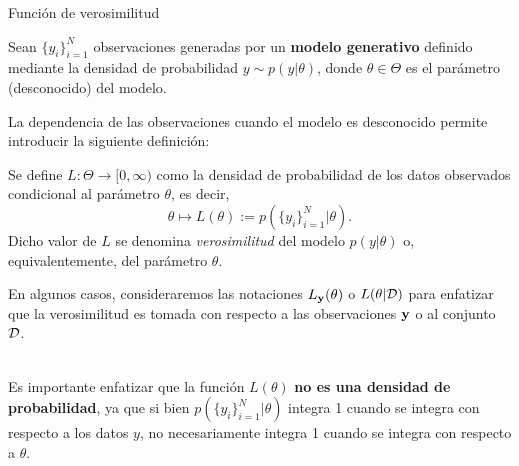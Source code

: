 \documentclass[handout, 9pt]{beamer}
\begin{document}
\begin{frame}{Función de verosimilitud}

Sean $\{y_i\}_{i=1}^N$ observaciones generadas por un \textbf{modelo generativo} definido mediante la densidad de  probabilidad  $y\sim p(y|\theta)$, donde $\theta\in\Theta$ es el parámetro (desconocido) del modelo.\pause
	
La dependencia de las observaciones cuando el modelo es desconocido permite introducir la siguiente definición:

\begin{definition}[verosimilitud]
Se define $L: \Theta \to [0,\infty)$ como la densidad de probabilidad de los datos observados condicional al parámetro $\theta$, es decir, 
\begin{equation*}
			\theta   \mapsto L(\theta) :=  p(\{y_i\}_{i=1}^N | \theta).
\end{equation*}
Dicho valor de $L$ se denomina \emph{verosimilitud} del modelo $p(y|\theta)$ o, equivalentemente, del  parámetro $\theta$. 
\end{definition}\pause

En algunos casos, consideraremos las notaciones $L_{\mathbf{y}}(\theta)$ o $L(\theta|{\mathcal D})$ para enfatizar que la verosimilitud es tomada con respecto a las observaciones  $\mathbf{y}$ o al conjunto ${\mathcal D}$.\\~\ \pause
	
Es importante enfatizar que la función $L(\theta)$ \textbf{no es una densidad de probabilidad}, ya que si bien $p(\{y_i\}_{i=1}^N | \theta)$ integra 1 cuando se integra con respecto a los datos $y$, no necesariamente integra 1 cuando se integra con respecto a $\theta$.
	
\end{frame}
\end{document}
